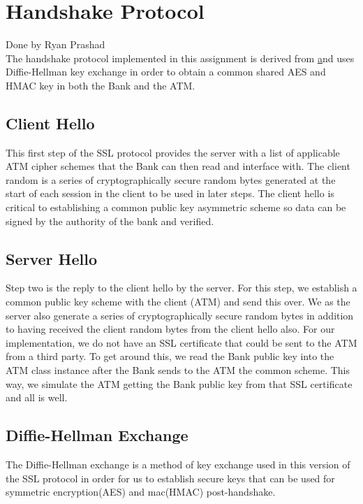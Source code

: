 \section{Handshake Protocol}\label{sec:handshake}
Done by Ryan Prashad\\

	\medskip
	The handshake protocol implemented in this assignment is derived from \href{https://www.cloudflare.com/learning/ssl/what-happens-in-a-tls-handshake/} and uses Diffie-Hellman key exchange in order to obtain a 
	common shared AES and HMAC key in both the Bank and the ATM.
	
	\subsection{Client Hello}\label{sec:clihello}
		This first step of the SSL protocol provides the server with a list of applicable ATM cipher schemes that the Bank can then read and interface with. The 
		client random is a series of cryptographically secure random bytes generated at the start of each session in the client to be used in later steps. The client
		hello is critical to establishing a common public key asymmetric scheme so data can be signed by the authority of the bank and verified.
	
	\subsection{Server Hello}\label{sec:serhello}
		Step two is the reply to the client hello by the server. For this step, we establish a common public key scheme with the client (ATM) and send this over. We
		as the server also generate a series of cryptographically secure random bytes in addition to having received the client random bytes from the client hello also. For our implementation, we do not have an SSL certificate that could be sent to the ATM from a third party. To get around this, we read the Bank public key into the ATM class instance after the Bank sends to the ATM the common scheme. This way, we simulate the ATM getting the Bank public key from that SSL certificate and all is well.
		
		\subsection{Diffie-Hellman Exchange}\label{sec:dhex}
			The Diffie-Hellman exchange is a method of key exchange used in this version of the SSL protocol in order for us to establish secure keys that can be used for symmetric encryption(AES) and mac(HMAC) post-handshake.
